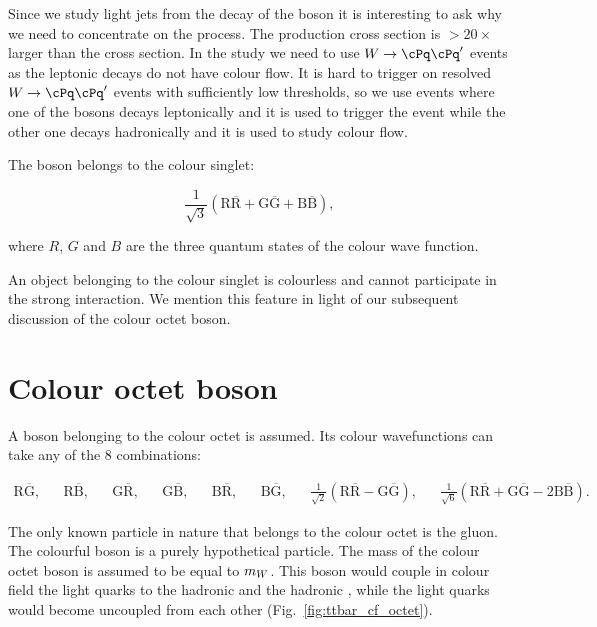Since we study light jets from the decay of the \PW boson it is interesting to ask why we need to concentrate on the \ttbar process. The \PW production cross section is $>20\times$ larger than the \ttbar cross section. In the study we need to use  $\PW\rightarrow\cPq\cPq'$ events as the leptonic decays do not have colour flow. It is hard to trigger on resolved $\PW\rightarrow\cPq\cPq'$ events with sufficiently low \pt thresholds, so we use \ttbar events where one of the \PW bosons decays leptonically and it is used to trigger the event while the other one decays hadronically and it is used to study colour flow.

The \PW boson belongs to the colour singlet:

\begin{equation}
\frac{1}{\sqrt{3}}\left(\text{R}\overline{\text{R}}+\text{G}\overline{\text{G}}+\text{B}\overline{\text{B}}\right),
\end{equation}

\noindent where $R$, $G$ and $B$ are the three quantum states of the colour wave function.

An object belonging to the colour singlet is colourless and cannot participate in the strong interaction. We mention this feature in light of our subsequent discussion of the colour octet \PW boson.

\section{Colour octet \PW boson}

A \PW boson belonging to the colour octet is assumed. Its colour wavefunctions can take any of the 8 combinations:

\begin{align}
\text{R}\overline{\text{G}}, &&
\text{R}\overline{\text{B}}, &&
\text{G}\overline{\text{R}}, &&
\text{G}\overline{\text{B}}, &&
\text{B}\overline{\text{R}}, &&
\text{B}\overline{\text{G}}, &&
\frac{1}{\sqrt{2}}\left(\text{R}\overline{\text{R}}-\text{G}\overline{\text{G}}\right), &&
\frac{1}{\sqrt{6}}\left(\text{R}\overline{\text{R}}+\text{G}\overline{\text{G}}-2\text{B}\overline{\text{B}}\right).
\end{align}

The only known particle in nature that belongs to the colour octet is the gluon. The colourful \PW boson is a purely hypothetical particle. The mass of the colour octet \PW boson is assumed to be equal to $m_{W}$. This boson would couple in colour field the light quarks to the hadronic \cPqb and the hadronic \cPqt, while the light quarks would become uncoupled from each other (Fig.~\ref{fig:ttbar_cf_octet}).

